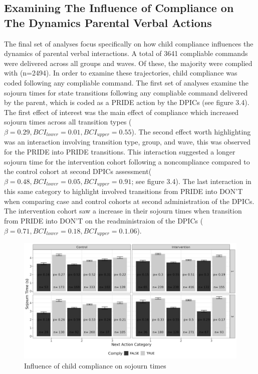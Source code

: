 \documentclass[12pt]{./styles/outhesis}
\begin{document}
\subsection{Examining The Influence of Compliance on The Dynamics Parental Verbal Actions}
The final set of analyses focus specifically on how child compliance
influences the dynamics of parental verbal interactions. A total of 3641
compliable commands were delivered across all groups and waves. Of
these, the majority were complied with (n=2494). In order to examine
these trajectories, child compliance was coded following any compliable
command. The first set of analyses examine the sojourn times for state
transitions following any compliable command delivered by the parent,
which is coded as a PRIDE action by the DPICs (see figure 3.4). The first
effect of interest was the main effect of compliance which increased
sojourn times across all transition types
(\(\beta=0.29, BCI_{lower}=0.01, BCI_{upper}=0.55\)). The second effect
worth highlighting was an interaction involving transition type, group,
and wave, this was observed for the PRIDE into PRIDE transitions. This
interaction suggested a longer sojourn time for the intervention cohort
following a noncompliance compared to the control cohort at second DPICs
assessment(\(\beta=0.48, BCI_{lower}=0.05, BCI_{upper}=0.91\); see
figure 3.4). The last interaction in this same category to highlight
involved transitions from PRIDE into DON'T when comparing case and
control cohorts at second administration of the DPICs. The intervention
cohort saw a increase in their sojourn times when transition from PRIDE
into DON'T on the readministraion of the DPICs
(\(\beta=0.71, BCI_{lower}=0.18, BCI_{upper}=0.1.06\)).

\begin{figure}
\centering
\includegraphics[width=15cm]{figures/complySojournTimes.png}
\caption{Influence of child compliance on sojourn times}
\end{figure}
\end{document}
